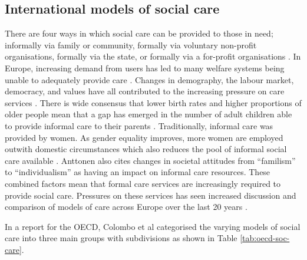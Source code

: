 \documentclass[12pt,]{report}
\begin{document}
\subsection{International models of social care}\label{subsec:access-sc-models}

There are four ways in which social care can be provided to those in
need; informally via family or community, formally via voluntary
non-profit organisations, formally via the state, or formally via a
for-profit organisations \citep{RN346}. In Europe, increasing demand
from users has led to many welfare systems being unable to adequately
provide care \citep{RN344, RN414}. Changes in demography, the labour
market, democracy, and values have all contributed to the increasing
pressure on care services \citep{RN406, RN342, RN414}. There is wide
consensus that lower birth rates and higher proportions of older people
mean that a gap has emerged in the number of adult children able to
provide informal care to their parents
\citep{RN342, RN343, RN344, RN346, RN345, RN414}. Traditionally,
informal care was provided by women. As gender equality improves, more
women are employed outwith domestic circumstances which also reduces the
pool of informal social care available \citep{RN342}. Anttonen
\citeyearpar{RN342} also cites changes in societal attitudes from
``familism'' to ``individualism'' as having an impact on informal care
resources. These combined factors mean that formal care services are
increasingly required to provide social care. Pressures on these
services has seen increased discussion and comparison of models of care
across Europe over the last 20 years \citep{RN347, RN348, RN346, RN349}.

In a report for the OECD, Colombo et al \citeyearpar{RN414} categorised
the varying models of social care into three main groups with
subdivisions as shown in Table \ref{tab:oecd-soc-care}.
\end{document}
